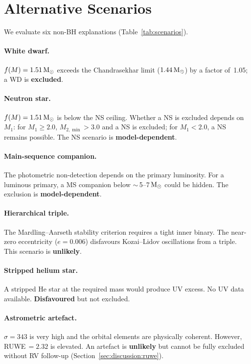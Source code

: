 \documentclass[usenatbib,fleqn]{mnras}
\newcommand{\Msun}{{\rm M}_\odot}
\newcommand{\fmass}{f(M)}
\begin{document}
\section{Alternative Scenarios}
\label{sec:alternatives}

We evaluate six non-BH explanations
(Table~\ref{tab:scenarios}).

\paragraph{White dwarf.}
$\fmass = 1.51\,\Msun$ exceeds the Chandrasekhar limit
($1.44\,\Msun$) by a factor of~1.05; a WD is \textbf{excluded}.

\paragraph{Neutron star.}
$\fmass = 1.51\,\Msun$ is below the NS ceiling.  Whether a NS is
excluded depends on $M_1$: for $M_1 \ge 2.0$, $M_{2,\min} > 3.0$
and a NS is excluded; for $M_1 < 2.0$, a NS remains possible.
The NS scenario is \textbf{model-dependent}.

\paragraph{Main-sequence companion.}
The photometric non-detection depends on the primary luminosity.
For a luminous primary, a MS companion below $\sim$\,5--7\,$\Msun$
could be hidden.  The exclusion is \textbf{model-dependent}.

\paragraph{Hierarchical triple.}
The Mardling--Aarseth stability criterion
\citep{MardlingAarseth2001} requires a tight inner binary.  The
near-zero eccentricity ($e = 0.006$) disfavours Kozai--Lidov
oscillations from a triple.  This scenario is \textbf{unlikely}.

\paragraph{Stripped helium star.}
A stripped He star at the required mass would produce UV excess.
No UV data available.  \textbf{Disfavoured} but not excluded.

\paragraph{Astrometric artefact.}
$\sigma = 343$ is very high and the orbital elements are
physically coherent.  However, RUWE\,$= 2.32$ is elevated.  An
artefact is \textbf{unlikely} but cannot be fully excluded without
RV follow-up (Section~\ref{sec:discussion:ruwe}).
\end{document}
